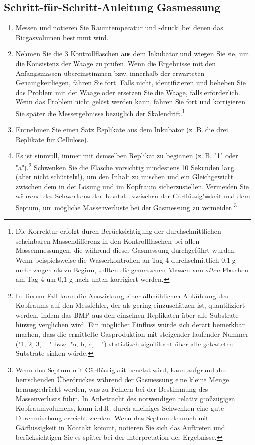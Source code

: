 \documentclass[]{article}
\begin{document}
\subsection{Schritt-für-Schritt-Anleitung Gasmessung}
\label{sec:steps}
\begin{enumerate}
    \item Messen und notieren Sie Raumtemperatur und  -druck, bei denen das Biogasvolumen bestimmt wird.
    \item Nehmen Sie die 3 Kontrollflaschen aus dem Inkubator und wiegen Sie sie, um die Konsistenz der Waage zu prüfen.
      Wenn die Ergebnisse mit den Anfangsmassen übereinstimmen bzw. innerhalb der erwarteten Genauigkeitliegen, fahren Sie fort. Falls nicht, identifizieren und beheben Sie das Problem mit der Waage oder ersetzen Sie die Waage, falls erforderlich.
      Wenn das Problem nicht gelöst werden kann, fahren Sie fort und korrigieren Sie später die Messergebnisse bezüglich der Skalendrift.\footnote{
        Die Korrektur erfolgt durch Berücksichtigung der durchschnittlichen scheinbaren Massendifferenz in den Kontrollflaschen bei allen Massenmessungen, die während dieser Gasmessung durchgeführt wurden.
        Wenn beispielsweise die Wasserkontrollen an Tag 4 durchschnittlich 0,1 g mehr wogen als zu Beginn, sollten die gemessenen Massen von \textit{allen} Flaschen am Tag 4 um 0,1 g nach unten korrigiert werden.
      }
    \item Entnehmen Sie einen Satz Replikate aus dem Inkubator (z. B. die drei Replikate für Cellulose).
    \item Es ist sinnvoll, immer mit demselben Replikat zu beginnen (z. B. "1" oder "a").\footnote{
        In diesem Fall kann die Auswirkung einer allmählichen Abkühlung des Kopfraums auf den Messfehler, der als gering einzuschätzen ist, quantifiziert werden, indem das BMP aus den einzelnen Replikaten über alle Substrate hinweg verglichen wird. Ein möglicher Einfluss würde sich derart bemerkbar machen, dass die ermittelte Gasproduktion mit steigender laufender Nummer ("1, 2, 3, ..." bzw. "a, b, c, ...") statistisch signifikant über alle getesteten Substrate sinken würde.}
        Schwenken Sie die Flasche vorsichtig mindestens 10 Sekunden lang (aber nicht schütteln!), um den Inhalt zu mischen und ein Gleichgewicht zwischen dem  in der Lösung und im Kopfraum sicherzustellen.
      Vermeiden Sie während des Schwenkens den Kontakt zwischen der Gärflüssig"=keit und dem Septum, um mögliche Massenverluste bei der Gasmessung zu vermeiden.\footnote{
        Wenn das Septum mit Gärflüssigkeit benetzt wird, kann aufgrund des herrschenden Überdruckes während der Gasmessung eine kleine Menge herausgedrückt werden, was zu Fehlern bei der Bestimmung des Massenverlusts führt. In Anbetracht des notwendigen relativ großzügigen Kopfraumvolumens, kann i.d.R. durch alleiniges Schwenken eine gute Durchmischung erreicht werden. Wenn das Septum dennoch mit Gärflüssigkeit in Kontakt kommt, notieren Sie sich das Auftreten und berücksichtigen Sie es später bei der Interpretation der Ergebnisse.
}
\end{enumerate}
\end{document}
